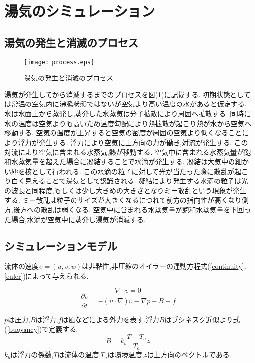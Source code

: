 \section{湯気のシミュレーション}

\subsection{湯気の発生と消滅のプロセス}
\begin{figure}[h]
\centering
\texttt{[image: process.eps]}
\caption{湯気の発生と消滅のプロセス}
\label{process}
\end{figure}
湯気が発生してから消滅するまでのプロセスを図(\ref{process})に記載する.	
初期状態としては常温の空気内に沸騰状態ではないが空気より高い温度の水があると仮定する.
水は水面上から蒸発し,蒸発した水蒸気は分子拡散により周囲へ拡散する.
同時に水の温度は空気よりも高いため温度勾配により熱拡散が起こり熱が水から空気へ移動する.
空気の温度が上昇すると空気の密度が周囲の空気より低くなることにより浮力が発生する.
浮力により空気に上方向の力が働き,対流が発生する.
この対流により空気に含まれる水蒸気,熱が移動する.
空気中に含まれる水蒸気量が飽和水蒸気量を超えた場合に凝結することで水滴が発生する.
凝結は大気中の細かい塵を核として行われる.
この水滴の粒子に対して光が当たった際に散乱が起こり白く見えることで湯気として認識される.
凝結により発生する水滴の粒子は光の波長と同程度,もしくは少し大きめの大きさとなりミー散乱という現象が発生する.
ミー散乱は粒子のサイズが大きくなるにつれて前方の指向性が高くなり側方,後方への散乱は弱くなる.
空気中に含まれる水蒸気量が飽和水蒸気量を下回った場合,水滴が空気中に蒸発し湯気が消滅する.

\subsection{シミュレーションモデル}

流体の速度$\upsilon=(u,v,w)$は非粘性,非圧縮のオイラーの運動方程式(\ref{continuity},\ref{euler})によって与えられる.

\begin{equation}
\label{continuity}
\nabla \cdot \upsilon = 0
\end{equation}
\begin{equation}
\label{euler}
\frac{\partial \upsilon}{\partial t} = -(\upsilon \cdot \nabla)\upsilon - \nabla p + B + f
\end{equation}

$p$は圧力,$B$は浮力,$f$は風などによる外力を表す.浮力$B$はブシネスク近似より式(\ref{buoyancy})で定義する.
\begin{equation}
\label{buoyancy}
B=k_{b}\frac{T-T_{a}}{T_{a}}z
\end{equation}
$k_{b}$は浮力の係数,$T$は流体の温度,$T_{a}$は環境温度,$z$は上方向のベクトルである.

